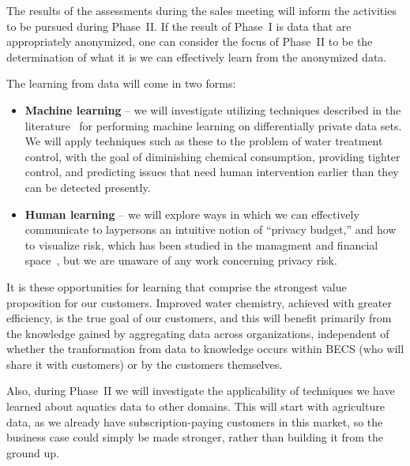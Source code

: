 The results of the assessments during the sales meeting will inform
the activities to be pursued during Phase~II.
If the result of Phase~I is data that are appropriately anonymized,
one can consider the focus of Phase~II to be the determination of
what it is we can effectively learn from the anonymized data.

The learning from data will come in two forms:
\begin{itemize}
\item {\bf Machine learning} -- we will investigate utilizing techniques
described in the literature~\cite{acgmmtz16,fs10,ss15} for performing machine
learning on differentially private data sets.
We will apply techniques such as these to the problem of water treatment
control, with the goal of diminishing chemical consumption, providing
tighter control, and predicting issues that need human intervention
earlier than they can be detected presently.
\item {\bf Human learning} -- we will explore ways in which we can effectively
communicate to laypersons an intuitive notion of ``privacy budget,'' and
how to visualize risk, which has been studied in the
managment and
financial space~\cite{Eppler09,Sarlin16}, but we are unaware of any
work concerning privacy risk.
\end{itemize}

It is these opportunities for learning that comprise the strongest value
proposition for our customers.  Improved water chemistry, achieved with
greater efficiency, is the true goal of our customers, and this will benefit
primarily from the knowledge gained by aggregating data across organizations,
independent of whether the tranformation from data to knowledge occurs
within BECS (who will share it with customers) or by the customers themselves.

Also, during Phase~II we will investigate the applicability of techniques
we have learned about aquatics data to other domains.  This will start with
agriculture data, as we already have subscription-paying customers in
this market, so the business case could simply be made stronger, rather
than building it from the ground up.
